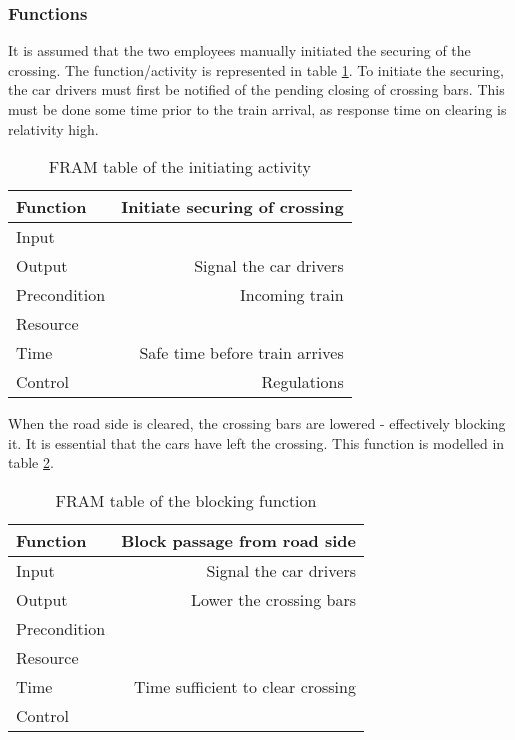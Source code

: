 \subsubsection{Functions}
It is assumed that the two employees manually initiated the securing of the crossing. The function/activity is represented in table \ref{table:function_initiate_securing}. To initiate the securing, the car drivers must first be notified of the pending closing of crossing bars. This must be done some time prior to the train arrival, as response time on clearing is relativity high.
\begin{table}[h]
\centering
    \begin{tabular}{ | l | r | }
    \hline
    Function     &  Initiate securing of crossing\\ \hline \hline
    Input        &  \\ \hline
    Output       &  Signal the car drivers\\ \hline
    Precondition &  Incoming train\\ \hline
    Resource     &  \\ \hline
    Time         &  Safe time before train arrives\\ \hline
    Control      &  Regulations\\ \hline
    \end{tabular}
\caption{FRAM table of the initiating activity}
\label{table:function_initiate_securing}
\end{table}

When the road side is cleared, the crossing bars are lowered - effectively blocking it. It is essential that the cars have left the crossing. This function is modelled in table \ref{table:function_block_from_road_side}.

\begin{table}[h]
\centering
    \begin{tabular}{ | l | r | }
    \hline
    Function     &  Block passage from road side\\ \hline \hline
    Input        &  Signal the car drivers\\ \hline
    Output       &  Lower the crossing bars\\ \hline
    Precondition &  \\ \hline
    Resource     &  \\ \hline
    Time         &  Time sufficient to clear crossing\\ \hline
    Control      &  \\ \hline
    \end{tabular}
\caption{FRAM table of the blocking function}
\label{table:function_block_from_road_side}
\end{table}

